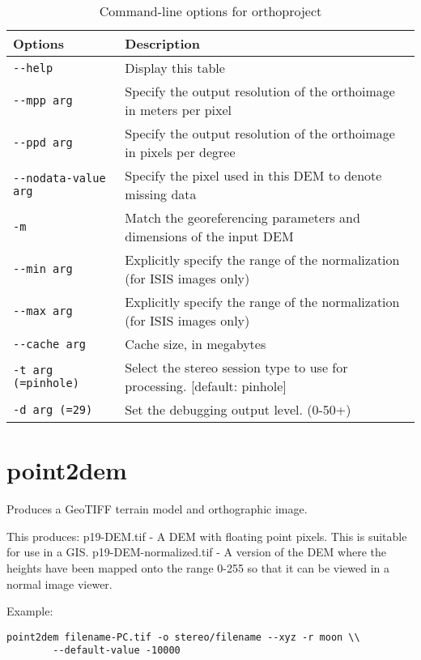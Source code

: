 \begin{longtable}{|l|p{10cm}|}
\caption{Command-line options for orthoproject}
\label{tbl:orthoproject}
\endfirsthead
\endhead
\endfoot
\endlastfoot
\hline
Options & Description \\ \hline \hline
\verb#--help# & Display this table \\ \hline
\verb#--mpp arg# & Specify the output resolution of the orthoimage in meters per pixel \\ \hline
\verb#--ppd arg# & Specify the output resolution of the orthoimage in pixels per degree \\ \hline
\verb#--nodata-value arg# & Specify the pixel used in this DEM to denote missing data \\ \hline
\verb#-m# & Match the georeferencing parameters and dimensions of the input DEM \\ \hline
\verb#--min arg# & Explicitly specify the range of the normalization (for ISIS images only) \\ \hline
\verb#--max arg# & Explicitly specify the range of the normalization (for ISIS images only) \\ \hline
\verb#--cache arg# & Cache size, in megabytes \\ \hline
\verb#-t arg (=pinhole)# & Select the stereo session type to use for processing. [default: pinhole] \\ \hline
\verb#-d arg (=29)# & Set the debugging output level. (0-50+) \\ \hline
\end{longtable}

\section{point2dem}
\label{point2dem}

Produces a GeoTIFF terrain model and orthographic image.

This produces: 
	p19-DEM.tif - A DEM with floating point pixels. This is suitable for use in a GIS.
	p19-DEM-normalized.tif - A version of the DEM where the heights have been mapped onto the range 0-255 so that it can be viewed in a normal image viewer.

Example:
\begin{verbatim}
point2dem filename-PC.tif -o stereo/filename --xyz -r moon \\
        --default-value -10000
\end{verbatim}

